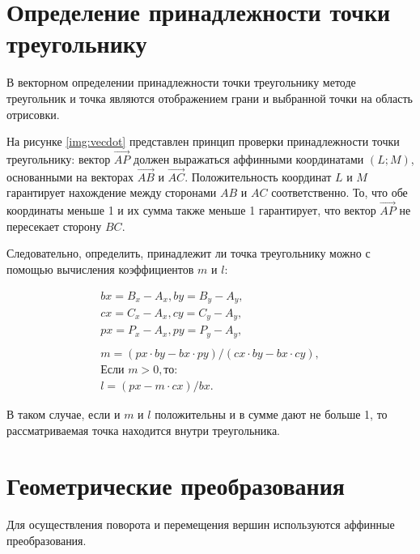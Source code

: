 
\FloatBarrier

\section{Определение принадлежности точки треугольнику}

В векторном определении принадлежности точки треугольнику методе треугольник и точка являются отображением грани и выбранной точки на область отрисовки. 


\FloatBarrier

На рисунке \ref{img:vecdot} представлен принцип проверки принадлежности точки треугольнику: вектор $\overrightarrow{AP}$ должен выражаться аффинными координатами $(L; M)$, основанными на векторах $\overrightarrow{AB}$ и $\overrightarrow{AC}$. Положительность координат $L$ и $M$ гарантирует нахождение между сторонами $AB$ и $AC$ соответственно. То, что обе координаты меньше 1 и их сумма также меньше 1 гарантирует, что вектор $\overrightarrow{AP}$ не пересекает сторону $BC$.

Следовательно, определить, принадлежит ли точка треугольнику можно с помощью вычисления коэффициентов $m$ и $l$:

\begin{gather*}
	bx = B_{x} - A_{x},
	by = B_{y} - A_{y}, \\
	cx = C_{x} - A_{x},
	cy = C_{y} - A_{y}, \\
	px = P_{x} - A_{x}, 
	py = P_{y} - A_{y}, \\
	\\
	m = (px \cdot by - bx \cdot py) / (cx \cdot by - bx \cdot cy), \\
	\textbf{Если } m > 0, \textbf{то:} \\
	l = (px - m \cdot cx) / bx.
\end{gather*}

В таком случае, если и $m$ и $l$ положительны и в сумме дают не больше 1, то рассматриваемая точка находится внутри треугольника.

\section{Геометрические преобразования}

Для осуществления поворота и перемещения вершин используются аффинные преобразования.

